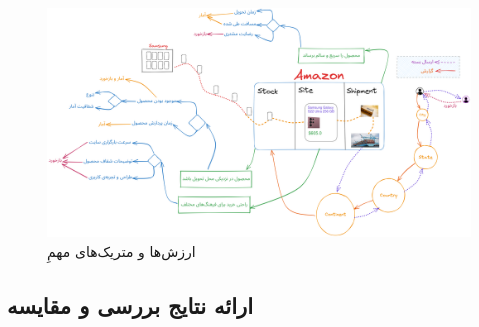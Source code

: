\documentclass[12pt]{article}
\begin{document}
\begin{itemize}
\begin{figure}[b]
    \begin{center}
        \includegraphics[width=0.95\textheight, height=0.95\textwidth, angle=90]{../images/amazon-comp(2)}
    \end{center}
\caption{ارزش‌ها و متریک‌های مهمِ }\label{amz-comp}
\end{figure}
\end{itemize}

\subsection{ارائه نتایج بررسی و مقایسه}
\end{document}
